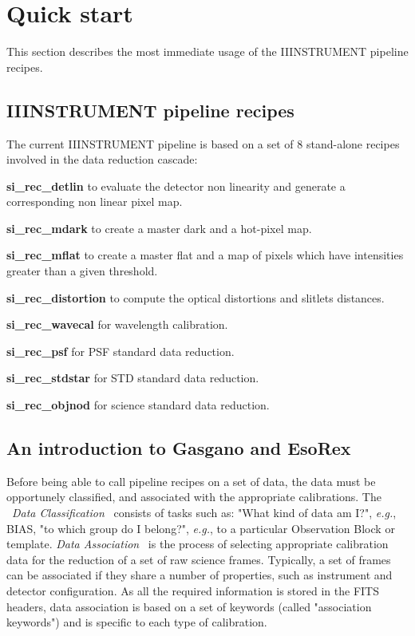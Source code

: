 \section{\label{COOK}Quick start}


This section describes the most immediate usage of the IIINSTRUMENT pipeline 
recipes.


\subsection{IIINSTRUMENT pipeline recipes}
\label{RECIPES}
The current IIINSTRUMENT pipeline is based on a set of 8 stand-alone recipes 
involved in the data reduction cascade:

\begin{description}
\item {\bf si\_rec\_detlin} to evaluate the detector non linearity and 
generate a corresponding non linear pixel map.
\item {\bf si\_rec\_mdark} to create a master dark and a hot-pixel map. 
\item {\bf si\_rec\_mflat} to create a master flat and a map of pixels 
which have intensities greater than a given threshold.
\item {\bf si\_rec\_distortion} to compute the optical distortions and 
slitlets distances. 
\item {\bf si\_rec\_wavecal} for wavelength calibration.
\item {\bf si\_rec\_psf} for PSF standard data reduction.
\item {\bf si\_rec\_stdstar} for STD standard data reduction.
\item {\bf si\_rec\_objnod} for science standard data reduction.
\end{description}

\subsection{An introduction to Gasgano and EsoRex}
\label{LAUNCH}

Before being able to call pipeline recipes on a set of data, the data 
must be opportunely classified, and associated with the appropriate
calibrations. The \ {\it Data Classification} \ consists of tasks
such as: "What kind of
data am I?", {\it e.g.}, BIAS, "to which group do I belong?",
{\it e.g.}, to a particular Observation Block or template.
{\it Data Association} \ is the process of selecting appropriate
calibration
data for the reduction of a set of raw science frames. Typically, a set
of frames can be associated if they share a number of properties, such as
instrument and detector configuration. As all the required information is
stored in the FITS headers, data association is based on a set of
keywords (called "association keywords") and is specific to each type of
calibration.

